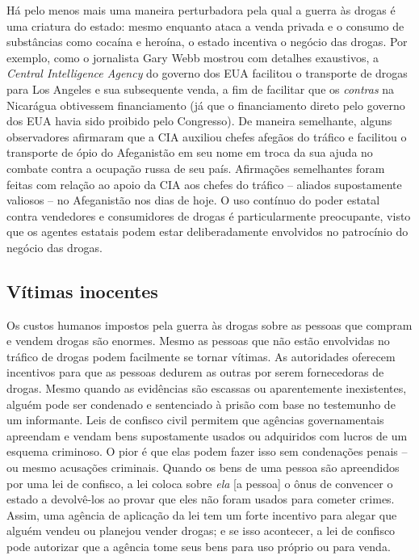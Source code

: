 Há pelo menos mais uma maneira perturbadora pela qual a guerra às drogas é uma criatura do estado: mesmo enquanto ataca a venda privada e o consumo de substâncias como cocaína e heroína, o estado incentiva o negócio das drogas. Por exemplo, como o jornalista Gary Webb mostrou com detalhes exaustivos, a \emph{Central Intelligence Agency} do governo dos EUA facilitou o transporte de drogas para Los Angeles e sua subsequente venda, a fim de facilitar que os \emph{contras} na Nicarágua obtivessem financiamento (já que o financiamento direto pelo governo dos EUA havia sido proibido pelo Congresso). De maneira semelhante, alguns observadores afirmaram que a CIA auxiliou chefes afegãos do tráfico e facilitou o transporte de ópio do Afeganistão em seu nome em troca da sua ajuda no combate contra a ocupação russa de seu país. Afirmações semelhantes foram feitas com relação ao apoio da CIA aos chefes do tráfico -- aliados supostamente valiosos -- no Afeganistão nos dias de hoje. O uso contínuo do poder estatal contra vendedores e consumidores de drogas é particularmente preocupante, visto que os agentes estatais podem estar deliberadamente envolvidos no patrocínio do negócio das drogas.

\subsection*{Vítimas inocentes}

Os custos humanos impostos pela guerra às drogas sobre as pessoas que compram e vendem drogas são enormes. Mesmo as pessoas que não estão envolvidas no tráfico de drogas podem facilmente se tornar vítimas. As autoridades oferecem incentivos para que as pessoas dedurem as outras por serem fornecedoras de drogas. Mesmo quando as evidências são escassas ou aparentemente inexistentes, alguém pode ser condenado e sentenciado à prisão com base no testemunho de um informante. Leis de confisco civil permitem que agências governamentais apreendam e vendam bens supostamente usados ou adquiridos com lucros de um esquema criminoso. O pior é que elas podem fazer isso sem condenações penais -- ou mesmo acusações criminais. Quando os bens de uma pessoa são apreendidos por uma lei de confisco, a lei coloca sobre \emph{ela} [a pessoa] o ônus de convencer o estado a devolvê-los ao provar que eles não foram usados para cometer crimes. Assim, uma agência de aplicação da lei tem um forte incentivo para alegar que alguém vendeu ou planejou vender drogas; e se isso acontecer, a lei de confisco pode autorizar que a agência tome seus bens para uso próprio ou para venda.

